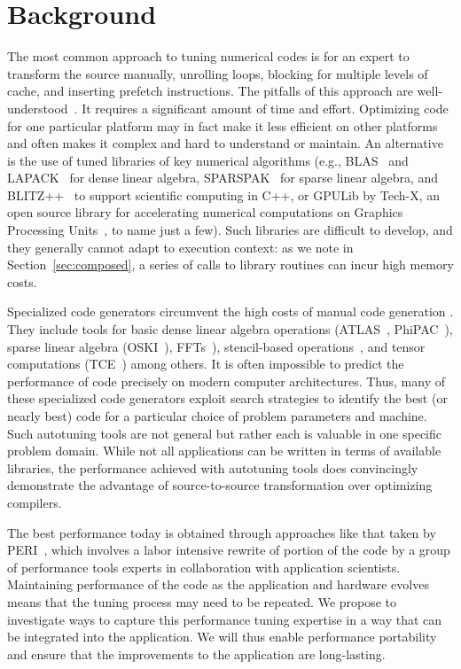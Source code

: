 \documentclass[11pt]{article}
\begin{document}
\section{Background}
\label{sec:background}




The most common approach  to tuning numerical codes is for an expert to transform the source manually, unrolling loops, blocking for multiple levels of cache, and inserting prefetch instructions.  The pitfalls of this approach are well-understood~\cite{Goedecker01}.  It requires a significant amount of time and effort. Optimizing code for one particular platform may in fact make it less efficient on other platforms and often makes it complex and hard to understand or maintain.    An alternative is the use of tuned libraries of key numerical algorithms (e.g., BLAS~\cite{Dongarra:1990fk} and LAPACK~\cite{LAPACK} for dense linear algebra, SPARSPAK~\cite{sparspak} for sparse linear algebra, and BLITZ++~\cite{blitz} to support scientific computing in C++, or GPULib by Tech-X, an open source library for accelerating numerical computations on Graphics Processing Units~\cite{gpulib}, to name just a few). Such libraries are difficult to develop, and they generally cannot adapt to execution context: as we note in Section~\ref{sec:composed}, a series of calls to library routines can incur high memory costs.

Specialized code generators circumvent the high costs of manual code generation . They include tools for basic dense linear algebra operations (ATLAS~\cite{WN147}, PhiPAC~\cite{bilmes97optimizing,phipacwww}), sparse linear algebra (OSKI~\cite{vuduc05}), FFTs~\cite{FFTW,Spiral}), stencil-based operations~\cite{kamil06}, and tensor computations (TCE~\cite{TCE}) among others.  It is often impossible to predict the performance of code precisely on modern computer architectures. Thus, many of these specialized code generators exploit search strategies to identify the best (or nearly best) code for a particular choice of problem parameters and machine. Such autotuning tools are not general but rather each is valuable in one specific problem domain. While not all applications can be written in terms of available libraries, the performance achieved with autotuning tools does convincingly demonstrate the advantage of source-to-source transformation over optimizing compilers.

The best performance today is obtained through approaches like that taken by PERI~\cite{PERI}, which involves a labor intensive rewrite of portion of the code by a group of performance tools experts in collaboration with application scientists. Maintaining performance of the code as the application and hardware evolves means that the tuning process may need to be repeated. We propose to investigate ways to capture this performance tuning expertise in a way that can be integrated into the application. We will thus enable performance portability and ensure that the improvements to the application are long-lasting.
\end{document}
